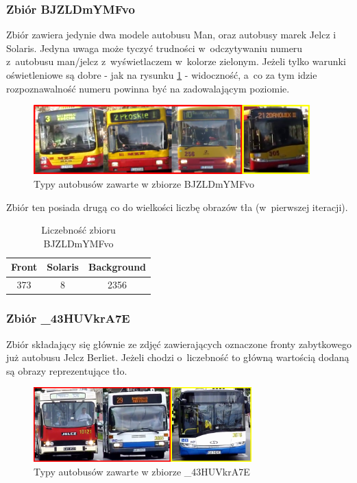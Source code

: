 \subsubsection{Zbiór BJZLDmYMFvo}

Zbiór zawiera jedynie dwa modele autobusu Man, oraz autobusy marek
Jelcz i Solaris. Jedyna uwaga może tyczyć trudności w~odczytywaniu
numeru z~autobusu man/jelcz z~wyświetlaczem w~kolorze zielonym. Jeżeli tylko
warunki oświetleniowe są dobre - jak na rysunku \ref{fig:BJZLDmYMFvo_types}
- widoczność, a~co za tym idzie rozpoznawalność numeru powinna być na 
zadowalającym poziomie.

\begin{figure}[!h]
    \centering
    \includegraphics[width=0.95\textwidth]{img/exp_trainig_data_BJZ}
    \caption{Typy autobusów zawarte w zbiorze BJZLDmYMFvo}
    \label{fig:BJZLDmYMFvo_types}
\end{figure}

Zbiór ten posiada drugą co do wielkości 
liczbę obrazów tła (w~pierwszej iteracji). 

\begin{table}[!h]
    \centering
    \begin{tabular}{c|c|c}
        Front   & Solaris   & Background \\ \hline
        373     & 8         & 2356
    \end{tabular}
    \caption{Liczebność zbioru BJZLDmYMFvo}
    \label{tab:BJZLDmYMFvo_count}
\end{table}

\subsubsection{Zbiór \_43HUVkrA7E}

Zbiór składający się głównie ze zdjęć zawierających oznaczone fronty
zabytkowego już autobusu Jelcz Berliet. Jeżeli chodzi o~liczebność to 
główną wartością dodaną są obrazy reprezentujące tło.

\begin{figure}[!h]
    \centering
    \includegraphics[width=0.75\textwidth]{img/exp_trainig_data__43}
    \caption{Typy autobusów zawarte w zbiorze \_43HUVkrA7E}
    \label{fig:_43HUVkrA7E_types}
\end{figure}

